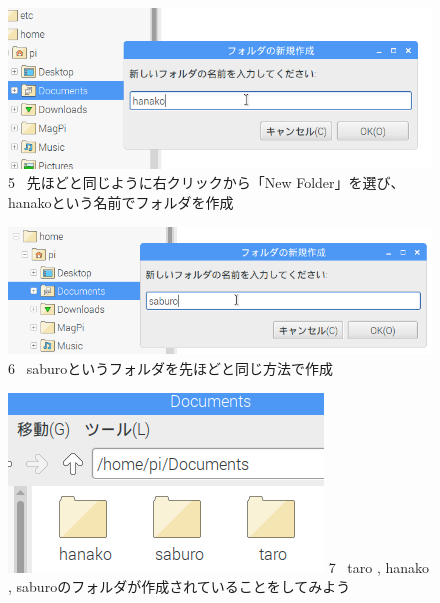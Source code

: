 \begin{figure}
  \\
  \vspace{10mm}
  \centering
  \begin{minipage}{0.8\textwidth}
  \includegraphics[width=\linewidth]{text01-img/textbook-img041.png}
    5
    \ 先ほどと同じように右クリックから「New Folder」を選び、hanakoという名前でフォルダを作成
  \end{minipage}
  \vspace{\baselineskip}

  \centering
  \begin{minipage}{0.8\textwidth}
  \includegraphics[width=\linewidth]{text01-img/textbook-img042.png}
    6
    \ saburoというフォルダを先ほどと同じ方法で作成
  \end{minipage}
  \vspace{\baselineskip}

  \centering
  \begin{minipage}{0.8\textwidth}
  \includegraphics[width=\linewidth]{text01-img/textbook-img043.png}
    7 
    \ taro , hanako , saburoのフォルダが作成されていることをしてみよう
  \end{minipage}
  \vspace{10mm}
  \flushleft


\end{figure}
